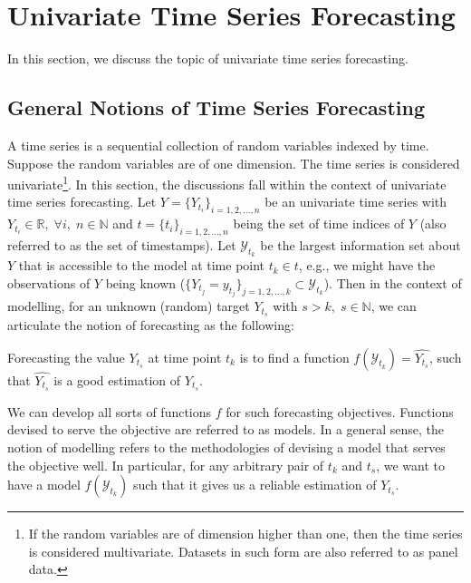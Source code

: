 \section{Univariate Time Series Forecasting}
In this section, we discuss the topic of univariate time series forecasting.

\subsection{General Notions of Time Series Forecasting}
A time series is a sequential collection of random variables indexed by time. Suppose the random variables are of one dimension. The time series is considered univariate\footnote{If the random variables are of dimension higher than one, then the time series is considered multivariate. Datasets in such form are also referred to as panel data.}. In this section, the discussions fall within the context of univariate time series forecasting. Let $Y = \{Y_{t_i} \}_{i = 1, 2, \ldots, n}$ be an univariate time series with $ Y_{t_i} \in \mathbb{R}, \; \forall i, \; n \in \mathbb{N}$ and $t = \{t_i \}_{i = 1, 2, \ldots, n}$ being the set of time indices of $Y$ (also referred to as the set of timestamps). Let $\mathcal{Y}_{t_k}$ be the largest information set about $Y$ that is accessible to the model at time point $t_k \in t$, e.g., we might have the observations of $Y$ being known ($\{Y_{t_j} = y_{t_j}\}_{j = 1, 2, \ldots, k } \subset \mathcal{Y}_{t_k}$). Then in the context of modelling, for an unknown (random) target $Y_{t_s}$ with $s > k, \; s \in \mathbb{N}$, we can articulate the notion of forecasting as the following:
\begin{displayquote}
    Forecasting the value $Y_{t_s}$ at time point $t_k$ is to find a function $f(\mathcal{Y}_{t_k}) = \widehat{Y_{t_s}}$, such that $\widehat{Y_{t_s}}$ is a good estimation of $Y_{t_s}$.
\end{displayquote}
We can develop all sorts of functions $f$ for such forecasting objectives. Functions devised to serve the objective are referred to as models. In a general sense, the notion of modelling refers to the methodologies of devising a model that serves the objective well. In particular, for any arbitrary pair of $t_k$ and $t_s$, we want to have a model $f(\mathcal{Y}_{t_k})$ such that it gives us a reliable estimation of $Y_{t_s}$.

